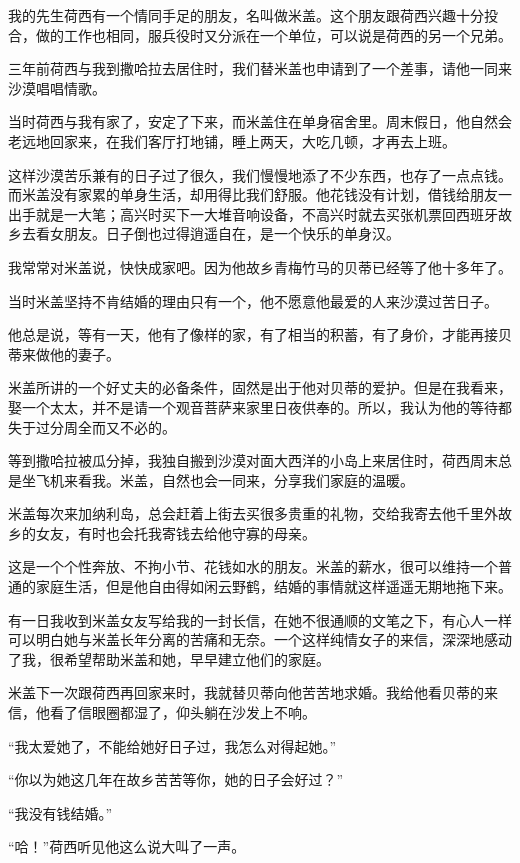 \par 我的先生荷西有一个情同手足的朋友，名叫做米盖。这个朋友跟荷西兴趣十分投合，做的工作也相同，服兵役时又分派在一个单位，可以说是荷西的另一个兄弟。
\par 三年前荷西与我到撒哈拉去居住时，我们替米盖也申请到了一个差事，请他一同来沙漠唱唱情歌。
\par 当时荷西与我有家了，安定了下来，而米盖住在单身宿舍里。周末假日，他自然会老远地回家来，在我们客厅打地铺，睡上两天，大吃几顿，才再去上班。
\par 这样沙漠苦乐兼有的日子过了很久，我们慢慢地添了不少东西，也存了一点点钱。而米盖没有家累的单身生活，却用得比我们舒服。他花钱没有计划，借钱给朋友一出手就是一大笔；高兴时买下一大堆音响设备，不高兴时就去买张机票回西班牙故乡去看女朋友。日子倒也过得逍遥自在，是一个快乐的单身汉。
\par 我常常对米盖说，快快成家吧。因为他故乡青梅竹马的贝蒂已经等了他十多年了。
\par 当时米盖坚持不肯结婚的理由只有一个，他不愿意他最爱的人来沙漠过苦日子。
\par 他总是说，等有一天，他有了像样的家，有了相当的积蓄，有了身价，才能再接贝蒂来做他的妻子。
\par 米盖所讲的一个好丈夫的必备条件，固然是出于他对贝蒂的爱护。但是在我看来，娶一个太太，并不是请一个观音菩萨来家里日夜供奉的。所以，我认为他的等待都失于过分周全而又不必的。
\par 等到撒哈拉被瓜分掉，我独自搬到沙漠对面大西洋的小岛上来居住时，荷西周末总是坐飞机来看我。米盖，自然也会一同来，分享我们家庭的温暖。
\par 米盖每次来加纳利岛，总会赶着上街去买很多贵重的礼物，交给我寄去他千里外故乡的女友，有时也会托我寄钱去给他守寡的母亲。
\par 这是一个个性奔放、不拘小节、花钱如水的朋友。米盖的薪水，很可以维持一个普通的家庭生活，但是他自由得如闲云野鹤，结婚的事情就这样遥遥无期地拖下来。
\par 有一日我收到米盖女友写给我的一封长信，在她不很通顺的文笔之下，有心人一样可以明白她与米盖长年分离的苦痛和无奈。一个这样纯情女子的来信，深深地感动了我，很希望帮助米盖和她，早早建立他们的家庭。
\par 米盖下一次跟荷西再回家来时，我就替贝蒂向他苦苦地求婚。我给他看贝蒂的来信，他看了信眼圈都湿了，仰头躺在沙发上不响。
\par “我太爱她了，不能给她好日子过，我怎么对得起她。”
\par “你以为她这几年在故乡苦苦等你，她的日子会好过？”
\par “我没有钱结婚。”
\par “哈！”荷西听见他这么说大叫了一声。
